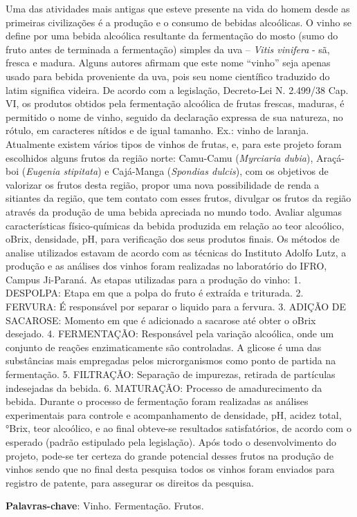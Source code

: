 \documentclass[article,12pt,onesidea,4paper,english,brazil]{abntex2}
\begin{document}
	\noindent Uma das atividades mais antigas que esteve presente na vida do
	homem desde as primeiras civilizações é a produção e o consumo de bebidas
	alcoólicas. O vinho se define por uma bebida alcoólica resultante da fermentação do
	mosto (sumo do fruto antes de terminada a fermentação) simples da uva – \textit{Vitis
	vinifera} - sã, fresca e madura. Alguns autores afirmam que este nome “vinho” seja
	apenas usado para bebida proveniente da uva, pois seu nome científico traduzido do
	latim significa videira. De acordo com a legislação, Decreto-Lei N. 2.499/38 Cap. VI,
	os produtos obtidos pela fermentação alcoólica de frutas frescas, maduras, é
	permitido o nome de vinho, seguido da declaração expressa de sua natureza, no
	rótulo, em caracteres nítidos e de igual tamanho. Ex.: vinho de laranja. Atualmente
	existem vários tipos de vinhos de frutas, e, para este projeto foram escolhidos alguns
	frutos da região norte: Camu-Camu (\textit{Myrciaria dubia}), Araçá-boi (\textit{Eugenia stipitata}) e Cajá-Manga (\textit{Spondias dulcis}), com os objetivos de valorizar os frutos desta região, propor uma nova possibilidade de renda a sitiantes da região, que tem contato com esses frutos, divulgar os frutos da região através da produção de uma bebida
	apreciada no mundo todo. Avaliar algumas características
	físico-químicas da bebida produzida em relação ao teor alcoólico, oBrix, densidade,
	pH, para verificação dos seus produtos finais. Os métodos de analise utilizados
	estavam de acordo com as técnicas do Instituto Adolfo Lutz, a produção e as
	análises dos vinhos foram realizadas no laboratório do IFRO, Campus Ji-Paraná. As
	etapas utilizadas para a produção do vinho: 1. DESPOLPA: Etapa em que a polpa
	do fruto é extraída e triturada. 2. FERVURA: É responsável por separar o liquido
	para a fervura. 3. ADIÇÃO DE SACAROSE: Momento em que é adicionado a
	sacarose até obter o oBrix desejado. 4. FERMENTAÇÃO: Responsável pela variação
	alcoólica, onde um conjunto de reações enzimaticamente são controladas. A glicose
	é uma das substâncias mais empregadas pelos microrganismos como ponto de
	partida na fermentação. 5. FILTRAÇÃO: Separação de impurezas, retirada de
	partículas indesejadas da bebida. 6. MATURAÇÃO: Processo de amadurecimento
	da bebida. Durante o processo de fermentação foram
	realizadas as análises experimentais para controle e acompanhamento de
	densidade, pH, acidez total, °Brix, teor alcoólico, e ao final obteve-se resultados
	satisfatórios, de acordo com o esperado (padrão estipulado pela legislação).
	 Após todo o desenvolvimento do projeto, pode-se ter certeza do grande
	potencial desses frutos na produção de vinhos sendo que no final desta pesquisa
	todos os vinhos foram enviados para registro de patente, para assegurar os direitos
	da pesquisa.
	
	\vspace{\onelineskip}
	
	\noindent
	\textbf{Palavras-chave}: Vinho. Fermentação. Frutos.
	
\end{document}
